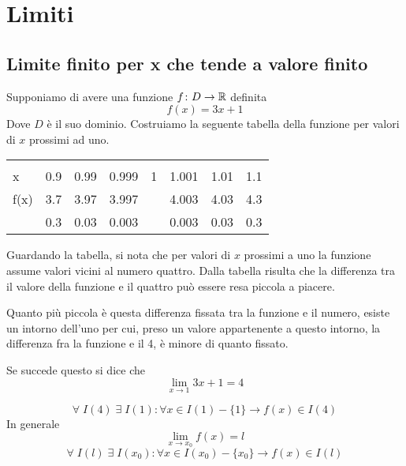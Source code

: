 \chapter{Limiti}
\section{Limite finito per x che tende a valore finito}
Supponiamo di avere una funzione $f\colon D\to{}\mathbb{R}$ definita \[f(x)=3x+1\] Dove $D$ è il suo dominio. Costruiamo la seguente tabella della funzione per valori di $x$ prossimi ad uno.
\begin{center}
\begin{tabular}{@{}L*{7}{c}}
	\toprule
&&	&&\\
x	& 0.9 & 0.99 & 0.999&1 &1.001  &1.01  & 1.1 \\
\cmidrule(r){2-8} 
f(x)	&3.7  & 3.97 &3.997 & & 4.003 & 4.03 & 4.3 \\ 
\cmidrule(r){2-8} 
& 0.3 &0.03  &0.003  &  & 0.003 &0.03& 0.3 \\ 
\bottomrule
\end{tabular}
\end{center}
Guardando la tabella, si nota che per valori di $x$ prossimi a uno la funzione assume valori vicini al numero quattro. Dalla tabella risulta che la differenza tra il valore della funzione e il quattro può essere resa piccola a piacere.\par Quanto più piccola è questa differenza fissata tra la funzione e il numero, esiste un intorno dell'uno per cui, preso un valore appartenente a questo intorno, la differenza fra la funzione e il 4,  è minore di quanto fissato. 

Se succede questo si dice che \[\lim_{x\to 1}3x+1=4 \]

\begin{equation*}
\forall\; I(4)\; \exists\; I(1) : \forall x\in I(1)-\lbrace 1\rbrace \longrightarrow f(x)\in I(4)
\end{equation*}
In generale \begin{equation*}
\lim_{x\to x_0}f(x)=l
\end{equation*}
\begin{equation*}
\forall\; I(l)\; \exists\; I(x_0) : \forall x\in I(x_0)-\lbrace x_0\rbrace \longrightarrow f(x)\in I(l)
\end{equation*}
